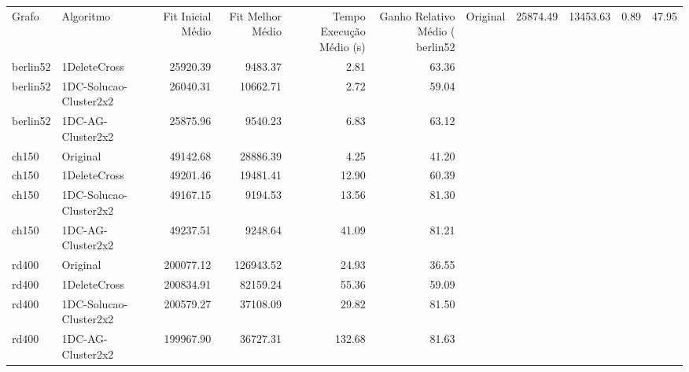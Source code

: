 \begin{tabular}{llrrrr}
\toprule
Grafo & Algoritmo & Fit Inicial Médio & Fit Melhor Médio & Tempo Execução Médio (s) & Ganho Relativo Médio (%
\midrule
berlin52 & Original & 25874.49 & 13453.63 & 0.89 & 47.95 \\
berlin52 & 1DeleteCross & 25920.39 & 9483.37 & 2.81 & 63.36 \\
berlin52 & 1DC-Solucao-Cluster2x2 & 26040.31 & 10662.71 & 2.72 & 59.04 \\
berlin52 & 1DC-AG-Cluster2x2 & 25875.96 & 9540.23 & 6.83 & 63.12 \\
ch150 & Original & 49142.68 & 28886.39 & 4.25 & 41.20 \\
ch150 & 1DeleteCross & 49201.46 & 19481.41 & 12.90 & 60.39 \\
ch150 & 1DC-Solucao-Cluster2x2 & 49167.15 & 9194.53 & 13.56 & 81.30 \\
ch150 & 1DC-AG-Cluster2x2 & 49237.51 & 9248.64 & 41.09 & 81.21 \\
rd400 & Original & 200077.12 & 126943.52 & 24.93 & 36.55 \\
rd400 & 1DeleteCross & 200834.91 & 82159.24 & 55.36 & 59.09 \\
rd400 & 1DC-Solucao-Cluster2x2 & 200579.27 & 37108.09 & 29.82 & 81.50 \\
rd400 & 1DC-AG-Cluster2x2 & 199967.90 & 36727.31 & 132.68 & 81.63 \\
\bottomrule
\end{tabular}
